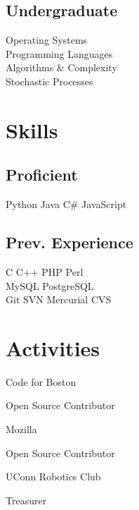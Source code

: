 \documentclass[]{deedy-resume}
\begin{document}
\begin{minipage}[t]{0.38\textwidth}
\subsection{Undergraduate}
Operating Systems \\
Programming Languages \\
Algorithms \& Complexity \\
Stochastic Processes


\section{Skills}
\subsection{Proficient}
Python \textbullet{} Java \textbullet{} C\# \textbullet{} JavaScript \\
\sectionsep
\subsection{Prev. Experience}
C \textbullet{} C++ \textbullet{} PHP \textbullet{} Perl \textbullet{} \\
MySQL \textbullet{} PostgreSQL \textbullet{} \\
Git \textbullet{} SVN \textbullet{} Mercurial \textbullet{} CVS


\section{Activities}
Code for Boston \\
\vspace{\topsep} %
\begin{tightemize}
\item Open Source Contributor
\end{tightemize}
Mozilla \\
\begin{tightemize}
\item Open Source Contributor
\end{tightemize}
UConn Robotics Club \\
\begin{tightemize}
\item Treasurer
\end{tightemize}


\end{minipage}
\end{document}
